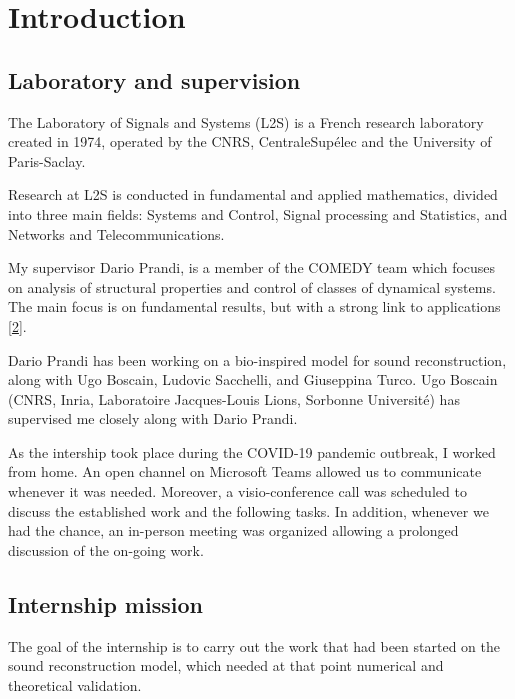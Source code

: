 \documentclass[
  american,
]{article}
\begin{document}
\pagebreak

\hypertarget{introduction}{%
\section{Introduction}\label{introduction}}

\hypertarget{laboratory-and-supervision}{%
\subsection{Laboratory and supervision}\label{laboratory-and-supervision}}

The Laboratory of Signals and Systems (L2S) is a French
research laboratory created in 1974, operated by the CNRS,
CentraleSupélec and the University of Paris-Saclay.

Research at L2S is conducted in fundamental and applied mathematics,
divided into three main fields:
Systems and Control, Signal processing and Statistics,
and Networks and Telecommunications.

My supervisor Dario Prandi, is a member of the COMEDY team
which focuses on analysis of structural properties
and control of classes of dynamical systems.
The main focus is on fundamental results, but with a strong
link to applications {[}\protect\hyperlink{ref-l2s}{2}{]}.

Dario Prandi has been working on a bio-inspired model for sound
reconstruction, along with Ugo Boscain, Ludovic Sacchelli,
and Giuseppina Turco.
Ugo Boscain (CNRS, Inria, Laboratoire Jacques-Louis Lions,
Sorbonne Université) has supervised me closely along with Dario Prandi.

As the intership took place during the COVID-19 pandemic outbreak,
I worked from home.
An open channel on Microsoft Teams allowed us to communicate
whenever it was needed. Moreover, a visio-conference call
was scheduled to discuss the established work and the following tasks.
In addition, whenever we had the chance, an in-person meeting was organized
allowing a prolonged discussion of the on-going work.

\hypertarget{internship-mission}{%
\subsection{Internship mission}\label{internship-mission}}

The goal of the internship is to carry out the work that had been started
on the sound reconstruction model, which needed at that point
numerical and theoretical validation.
\end{document}

